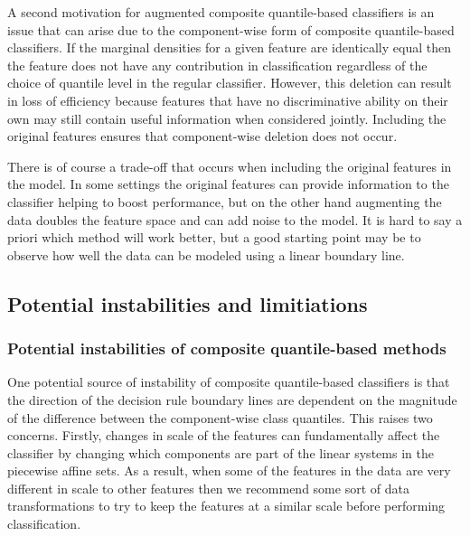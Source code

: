 A second motivation for augmented composite quantile-based classifiers is an
issue that can arise due to the component-wise form of composite quantile-based
classifiers.  If the marginal densities for a given feature are identically
equal then the feature does not have any contribution in classification
regardless of the choice of quantile level in the regular classifier.  However,
this deletion can result in loss of efficiency because features that have no
discriminative ability on their own may still contain useful information when
considered jointly.  Including the original features ensures that component-wise
deletion does not occur.

There is of course a trade-off that occurs when including the original features
in the model.  In some settings the original features can provide information to
the classifier helping to boost performance, but on the other hand augmenting
the data doubles the feature space and can add noise to the model.  It is hard
to say a priori which method will work better, but a good starting point may be
to observe how well the data can be modeled using a linear boundary line.


\subsection{Potential instabilities and limitiations}
\label{sec:instabilities-and-limitations}

\subsubsection{Potential instabilities of composite quantile-based methods}
\label{sec:instabilities}

One potential source of instability of composite quantile-based classifiers is
that the direction of the decision rule boundary lines are dependent on the
magnitude of the difference between the component-wise class quantiles.  This
raises two concerns.  Firstly, changes in scale of the features can
fundamentally affect the classifier by changing which components are part of the
linear systems in the piecewise affine sets.  As a result, when some of the
features in the data are very different in scale to other features then we
recommend some sort of data transformations to try to keep the features at a
similar scale before performing classification.

